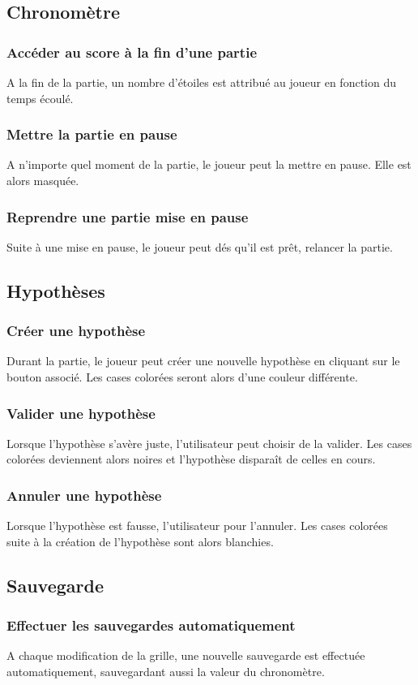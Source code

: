 \documentclass{report}
\begin{document}
    \subsection{Chronomètre}
			\subsubsection{Accéder au score à la fin d'une partie}
				A la fin de la partie, un nombre d'étoiles est attribué au joueur en fonction du temps écoulé.
			\subsubsection{Mettre la partie en pause}
				A n'importe quel moment de la partie, le joueur peut la mettre en pause. Elle est alors masquée.
	        \subsubsection{Reprendre une partie mise en pause}
    			Suite à une mise en pause, le joueur peut dés qu'il est prêt, relancer la partie.
	\subsection{Hypothèses}
		\subsubsection{Créer une hypothèse}
			Durant la partie, le joueur peut créer une nouvelle hypothèse en cliquant sur le bouton associé. Les cases colorées seront alors d'une couleur différente.
		\subsubsection{Valider une hypothèse}
			Lorsque l'hypothèse s'avère juste, l'utilisateur peut choisir de la valider. Les cases colorées deviennent alors noires et l'hypothèse disparaît de celles en cours.
		\subsubsection{Annuler une hypothèse}
			Lorsque l'hypothèse est fausse, l'utilisateur pour l'annuler. Les cases colorées suite à la création de l'hypothèse sont alors blanchies.
		
	\subsection{Sauvegarde}
		\subsubsection{Effectuer les sauvegardes automatiquement}
			A chaque modification de la grille, une nouvelle sauvegarde est effectuée automatiquement, sauvegardant aussi la valeur du chronomètre.
\end{document}
